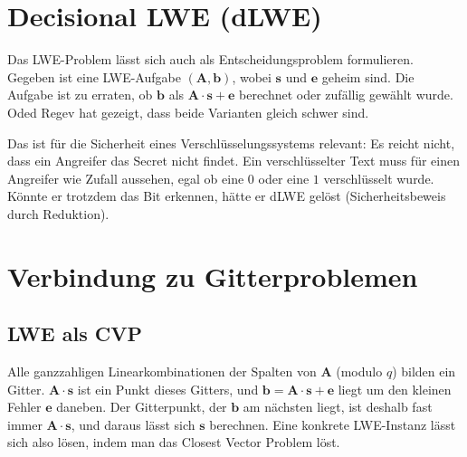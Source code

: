 \section{Decisional LWE (dLWE)}
Das LWE-Problem lässt sich auch als Entscheidungsproblem formulieren. Gegeben ist eine LWE-Aufgabe $(\mathbf{A}, \mathbf{b})$, wobei $\mathbf{s}$ und $\mathbf{e}$ geheim sind. Die Aufgabe ist zu erraten, ob $\mathbf{b}$ als $\mathbf{A} \cdot \mathbf{s} + \mathbf{e}$ berechnet oder zufällig gewählt wurde. Oded Regev hat gezeigt, dass beide Varianten gleich schwer sind.

Das ist für die Sicherheit eines Verschlüsselungssystems relevant: Es reicht nicht, dass ein Angreifer das Secret nicht findet.
Ein verschlüsselter Text muss für einen Angreifer wie Zufall aussehen, egal ob eine $0$ oder eine $1$ verschlüsselt wurde.
Könnte er trotzdem das Bit erkennen, hätte er dLWE gelöst (Sicherheitsbeweis durch Reduktion).

\section{Verbindung zu Gitterproblemen}
\subsection{LWE als CVP}
Alle ganzzahligen Linearkombinationen der Spalten von $\mathbf{A}$ (modulo $q$) bilden ein Gitter. $\mathbf{A} \cdot \mathbf{s}$ ist ein Punkt dieses Gitters, und $\mathbf{b} = \mathbf{A} \cdot \mathbf{s} + \mathbf{e}$ liegt um den kleinen Fehler $\mathbf{e}$ daneben. Der Gitterpunkt, der $\mathbf{b}$ am nächsten liegt, ist deshalb fast immer $\mathbf{A} \cdot \mathbf{s}$, und daraus lässt sich $\mathbf{s}$ berechnen. Eine konkrete LWE-Instanz lässt sich also lösen, indem man das Closest Vector Problem löst.

